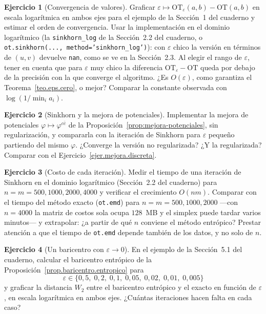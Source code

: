 \documentclass[12pt, a4paper]{amsbook}
\newcommand{\ve}{\varepsilon}
\theoremstyle{remark}
\theoremstyle{definition}
\newtheorem{ejercicio}{Ejercicio}[chapter]
\numberwithin{section}{chapter}
\numberwithin{subsection}{section}
\numberwithin{equation}{section}
\numberwithin{figure}{chapter}
\begin{document}
\begin{ejercicio}[Convergencia de valores]\label{ejc.eps.valores}
Graficar $\ve\mapsto\mathrm{OT}_\ve(a,b)-\mathrm{OT}(a,b)$ en escala
logarítmica en ambos ejes para el ejemplo de la Sección~1 del cuaderno y
estimar el orden de convergencia. Usar la implementación en el dominio
logarítmico (la \texttt{sinkhorn\_log} de la Sección~2.2 del cuaderno, o
\texttt{ot.sinkhorn(..., method='sinkhorn\_log')}): con $\ve$ chico la versión
en términos de $(u,v)$ devuelve \texttt{nan}, como se ve en la Sección~2.3.
Al elegir el rango de $\ve$, tener en cuenta que para $\ve$ muy chico la
diferencia $\mathrm{OT}_\ve-\mathrm{OT}$ queda por debajo de la precisión con
la que converge el algoritmo. ¿Es $O(\ve)$, como garantiza el
Teorema~\ref{teo.eps.cero}, o mejor? Comparar la constante observada con
$\log(1/\min_ia_i)$.
\end{ejercicio}

\begin{ejercicio}[Sinkhorn y la mejora de potenciales]\label{ejc.eps.mejora}
Implementar la mejora de potenciales $\varphi\mapsto\varphi^{c\bar c}$ de la
Proposición~\ref{prop:mejora-potenciales}, sin regularización, y compararla
con la iteración de Sinkhorn para $\ve$ pequeño partiendo del mismo $\varphi$.
¿Converge la versión no regularizada? ¿Y la regularizada? Comparar con el
Ejercicio~\ref{ejer.mejora.discreta}.
\end{ejercicio}

\begin{ejercicio}[Costo de cada iteración]\label{ejc.eps.costo}
Medir el tiempo de una iteración de Sinkhorn en el dominio logarítmico
(Sección~2.2 del cuaderno) para $n=m=500,1000,2000,4000$ y verificar el
crecimiento $O(nm)$. Comparar con el tiempo del método exacto
(\texttt{ot.emd}) para $n=m=500,1000,2000$ —con $n=4000$ la matriz de costos
sola ocupa $128$~MB y el simplex puede tardar varios minutos— y extrapolar:
¿a partir de qué $n$ conviene el método entrópico? Prestar atención a que el
tiempo de \texttt{ot.emd} depende también de los datos, y no solo de $n$.
\end{ejercicio}

\begin{ejercicio}[Un baricentro con $\ve\to0$]\label{ejc.eps.baricentro}
En el ejemplo de la Sección~5.1 del cuaderno, calcular el baricentro
entrópico de la Proposición~\ref{prop.baricentro.entropico} para
\[
\ve\in\{0{,}5,\;0{,}2,\;0{,}1,\;0{,}05,\;0{,}02,\;0{,}01,\;0{,}005\}
\]
y graficar la distancia $W_2$ entre el baricentro entrópico y el exacto en
función de $\ve$, en escala logarítmica en ambos ejes. ¿Cuántas iteraciones
hacen falta en cada caso?
\end{ejercicio}
\end{document}
